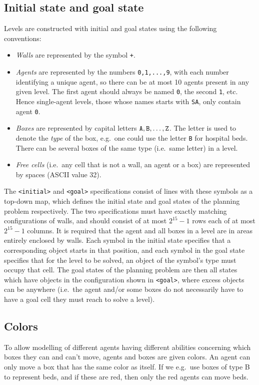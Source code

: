\documentclass[12pt,a4paper]{article}
\begin{document}
\subsection{Initial state and goal state}
Levels are constructed with initial and goal states using the following conventions:
\begin{itemize}
    \item \emph{Walls} are represented by the symbol \verb|+|.
    \item \emph{Agents} are represented by the numbers \verb|0,1,...,9|, with each number identifying a unique agent, so there can be at most 10 agents present in any given level. The first agent should always be named \verb|0|, the second \verb|1|, etc. Hence single-agent levels, those whose names starts with \texttt{SA}, only contain agent \texttt{0}. 
    \item \emph{Boxes} are represented by capital letters $\verb|A|, \verb|B|, \dots, \verb|Z|$. The letter is used to denote the \emph{type} of the box, e.g.\ one could use the letter \verb|B| for hospital beds. There can be several boxes of the same type (i.e.\ same letter) in a level.
     \item \emph{Free cells} (i.e.\ any cell that is not a wall, an agent or a box) are represented by spaces (ASCII value 32).
\end{itemize}
The \texttt{<initial>} and \texttt{<goal>} specifications consist of lines with these symbols as a top-down map, which defines the initial state and goal states of the planning problem respectively. The two specifications must have exactly matching configurations of walls, and should consist of at most $2^{15} - 1$ rows each of at most $2^{15} - 1$ columns. It is required that the agent and all boxes in a level are in areas entirely enclosed by walls. Each symbol in the initial state specifies that a corresponding object starts in that position, and each symbol in the goal state specifies that for the level to be solved, an object of the symbol's type must occupy that cell. The goal states of the planning problem are then all states which have objects in the configuration shown in \texttt{<goal>}, where excess objects can be anywhere (i.e.\ the agent and/or some boxes do not necessarily have to have a goal cell they must reach to solve a level).

\subsection{Colors}
To allow modelling of different agents having different abilities concerning which boxes they can and can't move, agents and boxes are given colors. An agent can only move a box that has the same color as itself. If we e.g.\  use boxes of type B to represent beds, and if these are red, then only the red agents can move beds.
\end{document}
